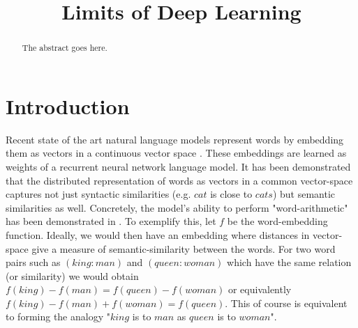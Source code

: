 \documentclass[conference]{IEEEtran}
\begin{document}
%
\title{Limits of Deep Learning}


\author{
\and
{}
}


\maketitle

\begin{abstract}
The abstract goes here.
\end{abstract}



%
\IEEEpeerreviewmaketitle


\section{Introduction}

Recent state of the art natural language models represent words by embedding them
as vectors in a continuous vector space \cite{mikolov2013efficient} \cite{pennington2014glove}.
These embeddings are learned as weights of a recurrent neural network language model.
It has been demonstrated that the distributed representation of words as vectors
in a common vector-space captures not just syntactic similarities (e.g. $cat$
is close to $cats$) but semantic similarities as well. Concretely, the model's ability to
perform "word-arithmetic" has been demonstrated in \cite{mikolov2013linguistic}.
To exemplify this, let $f$ be the word-embedding function. Ideally, we would then
have an embedding where distances in vector-space give a measure of
semantic-similarity between the words. For two word pairs such as $(king:man)$
and $(queen:woman)$ which have the same relation (or similarity) we would
obtain $f(king)-f(man) = f(queen) - f(woman)$ or equivalently $f(king)-f(man) +
f(woman) = f(queen)$. This of course is equivalent to forming the analogy "$king$ is
to $man$ as $queen$ is to $woman$". 
\end{document}
